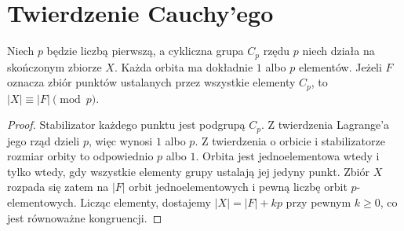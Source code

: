 \section{Twierdzenie Cauchy'ego}
\begin{lemat}
\label{aa:lem:orbit-cp}
Niech $p$ będzie liczbą pierwszą, a cykliczna grupa $C_p$
rzędu $p$ niech działa na skończonym zbiorze $X$.
Każda orbita ma dokładnie $1$ albo $p$ elementów.
Jeżeli $F$ oznacza zbiór punktów ustalanych przez wszystkie
elementy $C_p$, to $|X|\equiv |F|\pmod p$.
\end{lemat}
\begin{proof}
Stabilizator każdego punktu jest podgrupą $C_p$.
Z twierdzenia Lagrange'a jego rząd dzieli $p$,
więc wynosi $1$ albo $p$.
Z twierdzenia o orbicie i stabilizatorze
rozmiar orbity to odpowiednio $p$ albo $1$.
Orbita jest jednoelementowa wtedy i tylko wtedy,
gdy wszystkie elementy grupy ustalają jej jedyny punkt.
Zbiór $X$ rozpada się zatem na $|F|$ orbit jednoelementowych
i pewną liczbę orbit $p$-elementowych.
Licząc elementy, dostajemy $|X|=|F|+kp$
przy pewnym $k\ge0$, co jest równoważne kongruencji.
\end{proof}

